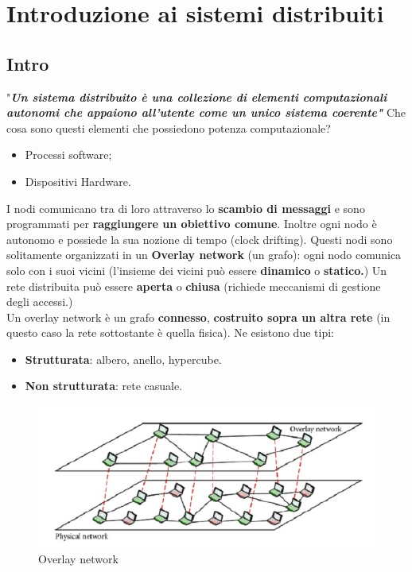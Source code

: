 \documentclass[12pt]{article}
\begin{document}
	\maketitle
	\tableofcontents
	\listoftables
	\listoffigures
\section{Introduzione ai sistemi distribuiti}
	\subsection{Intro}
		"\textit{\textbf{Un sistema distribuito è una collezione di elementi computazionali autonomi che appaiono all'utente come un unico sistema coerente"}}
		Che cosa sono questi elementi che possiedono potenza computazionale?
		\begin{itemize}
			\item Processi software;
			\item Dispositivi Hardware.
		\end{itemize}
		I nodi comunicano tra di loro attraverso lo \textbf{scambio di messaggi} e sono programmati per \textbf{raggiungere un obiettivo comune}. Inoltre ogni nodo è autonomo e possiede la sua nozione di tempo (clock drifting). Questi nodi sono solitamente organizzati in un \textbf{Overlay network} (un grafo): ogni nodo comunica solo con i suoi vicini (l'insieme dei vicini può essere \textbf{dinamico} o \textbf{statico.}) Un rete distribuita può essere \textbf{aperta} o \textbf{chiusa} (richiede meccanismi di gestione degli accessi.)\\
		Un overlay network è un grafo \textbf{connesso}, \textbf{costruito sopra un altra rete } (in questo caso la rete sottostante è quella fisica). Ne esistono due tipi:
		\begin{itemize}
			\item \textbf{Strutturata}: albero, anello, hypercube.
			\item \textbf{Non strutturata}: rete casuale.
		\end{itemize}
		\begin{figure}[h!]
			\centering
			\includegraphics[scale=0.50]{img/over.png}
			\caption{Overlay network}
		\end{figure}
\end{document}
